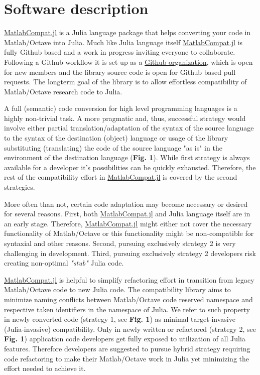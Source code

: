 \section{Software description}

\href{https://github.com/MatlabCompat/MatlabCompat.jl}{MatlabCompat.jl} is a Julia language package that helps converting your code in Matlab/Octave into Julia. Much like Julia language itself \href{https://github.com/MatlabCompat/MatlabCompat.jl}{MatlabCompat.jl} is fully Github based and a work in progress inviting everyone to collaborate. Following a Github workflow it is set up as a \href{https://github.com/MatlabCompat}{Github organization}, which is open for new members and the library source code is open for Github based pull requests. The longterm goal of the library is to allow effortless compatibility of Matlab/Octave research code to Julia.

A full (semantic) code conversion for high level programming languages is a highly non-trivial task. A more pragmatic and, thus, successful strategy would involve either partial translation/adaptation of the syntax of the source language to the syntax of the destination (object) language \cite{Ledley_1962} or usage of the library substituting (translating) the code of the source language "as is" in the environment of the destination language (\textbf{Fig. 1}). While first strategy is always available for a developer it's possibilities can be quickly exhausted. Therefore, the rest of the compatibility effort in \href{https://github.com/MatlabCompat/MatlabCompat.jl}{MatlabCompat.jl} is covered by the second strategies.

More often than not, certain code adaptation may become necessary or desired for several reasons. First,  both \href{https://github.com/MatlabCompat/MatlabCompat.jl}{MatlabCompat.jl} and Julia language itself are in an early stage. Therefore, \href{https://github.com/MatlabCompat/MatlabCompat.jl}{MatlabCompat.jl} might either not cover the necessary functionality of Matlab/Octave or this functionality might be non-compatible for syntaxial and other reasons. Second, pursuing exclusively strategy 2 is very challenging in development. Third, pursuing exclusively strategy 2 developers risk creating non-optimal \textit{"stub"} Julia code.

\href{https://github.com/MatlabCompat/MatlabCompat.jl}{MatlabCompat.jl} is helpful to simplify refactoring effort in transition from legacy Matlab/Octave code to new Julia code. The compatibility library aims to minimize naming conflicts between Matlab/Octave code reserved namespace and respective taken identifiers in the namespace of Julia. We refer to such property in newly converted code (strategy 1, see \textbf{Fig. 1}) as minimal target-invasive (Julia-invasive) compatibility.  Only in newly written or refactored (strategy 2, see \textbf{Fig. 1}) application code developers get fully exposed to utilization of all Julia features. Therefore developers are suggested to pursue hybrid strategy requiring code refactoring to make their Matlab/Octave work in Julia yet minimizing the effort needed to achieve it.


